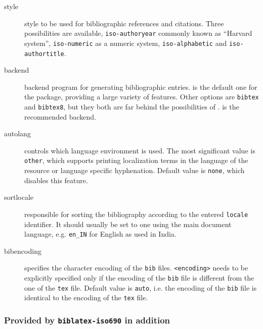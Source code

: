 \documentclass[a4paper,10pt]{ltxdockit}
\def\t|#1|{\texttt{#1}}
\newcommand*{\biber}{\sty{biber}\xspace}
\newcommand*{\biblatex}{\sty{biblatex}\xspace}
\begin{document}
\begin{description}
\item[style] style to be used for bibliographic references and citations.
Three possibilities are available, \t|iso-authoryear| commonly known as
“Harvard system”, \t|iso-numeric| as a numeric system, \t|iso-alphabetic|
and \t|iso-authortitle|.

\item[backend] backend program for generating bibliographic entries. \biber
is the default one for the \biblatex package, providing a large variety
of features. Other options are \t|bibtex| and \t|bibtex8|, but they both
are far behind the possibilities of \biber. \biber is the recommended backend.

\item[autolang] controls which language environment is used. The most
significant value is \t|other|, which supports printing localization
terms in the language of the resource or language specific hyphenation. 
Default value is \t|none|, which disables this feature.

\item[sortlocale] responsible for sorting the bibliography according to the
entered \t|locale| identifier. It should usually be set to one using the 
main document language, e.g. \t|en\_IN| for English as used in India.

\item[bibencoding] specifies the character encoding of the \t|bib| files. 
\t|<encoding>| needs to be explicitly specified only if the encoding of the 
\t|bib| file is different from the one of the \t|tex| file. Default value 
is \t|auto|, i.e. the encoding of the \t|bib| file is identical to the 
encoding of the \t|tex| file.
\end{description}

\subsubsection{Provided by \t|biblatex-iso690| in addition}
\end{document}
